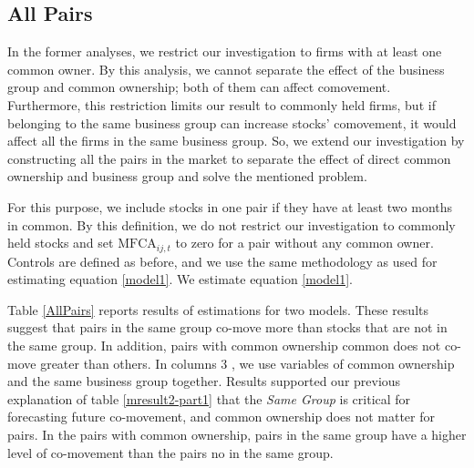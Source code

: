 				\subsection{All Pairs}
				\begin{LTR}
					In the former analyses, we restrict our investigation to firms with at least one common owner. By this analysis, we cannot separate the effect of the business group and common ownership; both of them can affect comovement. Furthermore, this restriction limits our result to commonly held firms, but if belonging to the same business group can increase stocks' comovement, it would affect all the firms in the same business group. 
					So, we extend our investigation by constructing all the pairs in the market to separate the effect of direct common ownership and business group and solve the mentioned problem. 
					
					For this purpose, we include stocks in one pair if they have at least two months in common. By this definition, we do not restrict our investigation to commonly held stocks and set $\text{MFCA}_{ij,t}$ to zero for a pair without any common owner. Controls are defined as before, and we use the same methodology as used for estimating equation \ref{model1}. We estimate equation \ref{model1}. 
					
					Table \ref{AllPairs} reports results of estimations for two models. These results suggest that pairs in the same group co-move more than stocks that are not in the same group. In addition, pairs with common ownership common does not co-move greater than others. In columns 3 , we use variables of common ownership and the same business group together. Results supported our previous explanation of table \ref{mresult2-part1} that the \textit{Same Group} is critical for forecasting future co-movement, and common ownership does not matter for pairs. In the pairs with common ownership, pairs in the same group have a higher level of co-movement than the pairs no in the same group.
					
					
				\end{LTR}
